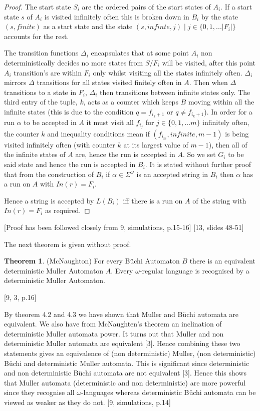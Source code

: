 \documentclass[a4paper,12pt]{report}
\theoremstyle{definition}
\newtheorem{theorem}{Theorem}[chapter]
\begin{document}
\begin{proof}
The start state $S_i$ are the ordered pairs of the start states of $A_i$. If a start state $s$ of $A_i$ is visited infinitely often this is broken down in $B_i$ by the state $(s,finite)$ as a start state and the state $(s, infinte, j)\mid j\in\{0,1,...|F_i|\}$ accounts for the rest. 

The transition functions $\Delta_i$ encapsulates that at some point $A_i$ non deterministically decides no more states from $S/F_i$ will be visited, after this point $A_i$ transition's are within $F_i$ only whilst visiting all the states infinitely often. $\Delta_i$ mirrors $\Delta$ transitions for all states visited finitely often in $A$. Then when $\Delta$ transitions to a state in $F_i$, $\Delta_i$ then transitions between infinite states only. The third entry of the tuple, $k$, acts as a counter which keeps $B$ moving within all the infinite states (this is due to the condition $q=f_{i_k+1}$ or $q\neq f_{i_k+1}$). In order for a run $\alpha$ to be accepted in $A$ it must visit all $f_{i_j}$ for $ j\in\{0,1,...m\}$ infinitely often, the counter $k$ and inequality conditions mean if $(f_{i_m}, infinite, m-1)$ is being visited infinitely often (with counter $k$ at its largest value of $m-1$), then all of the infinite states of $A$ are, hence the run is accepted in $A$. So we set $G_i$ to be said state and hence the run is accepted in $B_i$. 
It is stated without further proof that from the construction of $B_i$ if $\alpha\in\Sigma^\omega$ is an accepted string in $B_i$ then $\alpha$ has a run on $A$ with $In(r)=F_i$. 

Hence a string is accepted by  $L(B_i)$ iff there is a run on $A$ of the string with $In(r)=F_i$ as required. 
\end{proof}
[Proof has been followed closely from 9, simulations, p.15-16] [13, slides 48-51]

The next theorem is given without proof.
\begin{theorem}(McNaughton)
For every Büchi Automaton $B$ there is an equivalent deterministic Muller Automaton $A$. Every $\omega$-regular language is recognised by a deterministic Muller Automaton. 

[9, 3, p.16]
\end{theorem}

\medskip
By theorem 4.2 and 4.3 we have shown that Muller and Büchi automata are equivalent. We also have from McNaughten's theorem an inclination of deterministic Muller automata power.  It turns out that Muller and non deterministic Muller automata are equivalent [3]. Hence combining these two statements gives an equivalence of (non deterministic) Muller, (non deterministic) Büchi and deterministic Muller automata. 
This is significant since deterministic and non deterministic Büchi automata are not equivalent [3]. Hence this shows that Muller automata (deterministic and non deterministic) are more powerful since they recognise all $\omega$-languages whereas deterministic Büchi automata can be viewed as weaker as they do not. 
[9, simulations, p.14]
\end{document}

